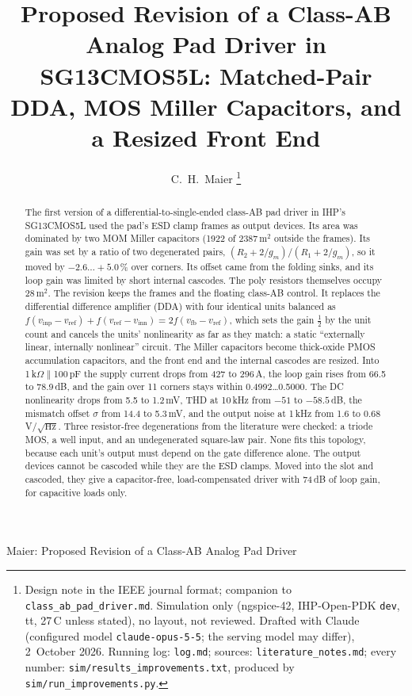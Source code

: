 \documentclass[journal]{IEEEtran}
\newcommand{\cell}[1]{\texttt{#1}}
\newcommand{\umsq}{\,\textmu m$^2$}
\newcommand{\uA}{\,\textmu A}
\newcommand{\mV}{\,mV}
\newcommand{\dB}{\,dB}
\newcommand{\vinp}{v_\mathrm{inp}}
\newcommand{\vinn}{v_\mathrm{inn}}
\newcommand{\vref}{v_\mathrm{ref}}
\newcommand{\vfb}{v_\mathrm{fb}}
\begin{document}
\title{Proposed Revision of a Class-AB Analog Pad Driver in SG13CMOS5L: Matched-Pair DDA,
MOS Miller Capacitors, and a Resized Front End}

\author{C.~H.~Maier%
\thanks{Design note in the IEEE journal format; companion to
\cell{class\_ab\_pad\_driver.md}. Simulation only (ngspice-42, IHP-Open-PDK \cell{dev}, tt,
27\,\textdegree C unless stated), no layout, not reviewed. Drafted with Claude (configured
model \cell{claude-opus-5-5}; the serving model may differ), 2~October 2026. Running log:
\cell{log.md}; sources: \cell{literature\_notes.md}; every number:
\cell{sim/results\_improvements.txt}, produced by \cell{sim/run\_improvements.py}.}}

%
{Maier: Proposed Revision of a Class-AB Analog Pad Driver}

\maketitle

\begin{abstract}
The first version of a differential-to-single-ended class-AB pad driver in IHP's SG13CMOS5L
used the pad's ESD clamp frames as output devices. Its area was dominated by two MOM Miller
capacitors (1922 of 2387\umsq{} outside the frames). Its gain was set by a ratio of two
degenerated pairs, $(R_2+2/g_m)/(R_1+2/g_m)$, so it moved by $-2.6\ldots+5.0$\,\% over
corners. Its offset came from the folding sinks, and its loop gain was limited by short
internal cascodes. The poly resistors themselves occupy 28\umsq{}. The revision keeps the
frames and the floating class-AB control. It replaces the differential difference amplifier
(DDA) with four identical units balanced as $f(\vinp-\vref)+f(\vref-\vinn)=2f(\vfb-\vref)$,
which sets the gain $\tfrac12$ by the unit count and cancels the units' nonlinearity as far
as they match: a static ``externally linear, internally nonlinear'' circuit. The Miller
capacitors become thick-oxide PMOS accumulation capacitors, and the front end and the
internal cascodes are resized. Into 1\,k$\Omega\parallel$100\,pF the supply current drops
from 427 to 296\uA{}, the loop gain rises from 66.5 to 78.9\dB, and the gain over 11 corners
stays within 0.4992\ldots0.5000. The DC nonlinearity drops from 5.5 to 1.2\mV, THD at 10\,kHz
from $-51$ to $-58.5$\dB, the mismatch offset $\sigma$ from 14.4 to 5.3\mV, and the output
noise at 1\,kHz from 1.6 to 0.68\,\textmu V/$\sqrt{\mathrm{Hz}}$. Three resistor-free
degenerations from the literature were checked: a triode MOS, a well input, and an
undegenerated square-law pair. None fits this topology, because each unit's output must
depend on the gate difference alone. The output devices cannot be cascoded while they are
the ESD clamps. Moved into the slot and cascoded, they give a capacitor-free,
load-compensated driver with 74\dB{} of loop gain, for capacitive loads only.
\end{abstract}
\end{document}
